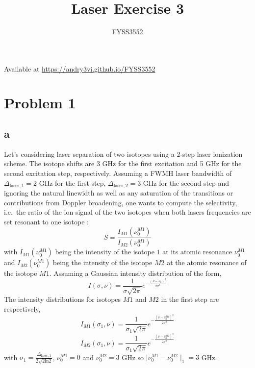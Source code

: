 \documentclass[
  a4paperpaper,
]{article}
\title{Laser Exercise 3}
\subtitle{FYSS3552}
\author{}
\date{}
\begin{document}
\maketitle
\ifdefined\Shaded\renewenvironment{Shaded}{\begin{tcolorbox}[boxrule=0pt, breakable, borderline west={3pt}{0pt}{shadecolor}, frame hidden, interior hidden, enhanced, sharp corners]}{\end{tcolorbox}}\fi

Available at \url{https://andry3vi.github.io/FYSS3552}

\hypertarget{problem-1}{%
\section{Problem 1}\label{problem-1}}

\hypertarget{a}{%
\subsection{a}\label{a}}

Let's considering laser separation of two isotopes using a 2-step laser
ionization scheme. The isotope shifts are 3 GHz for the first excitation
and 5 GHz for the second excitation step, respectively. Assuming a FWMH
laser bandwidth of \(\Delta_{\text{laser},1}=2\) GHz for the first step,
\(\Delta_{\text{laser},2}=3\) GHz for the second step and ignoring the
natural linewidth as well as any saturation of the transitions or
contributions from Doppler broadening, one wants to compute the
selectivity, i.e.~the ratio of the ion signal of the two isotopes when
both lasers frequencies are set resonant to one isotope : \[
    S=\frac{I_{M1}(\nu_0^{M1})}{I_{M2}(\nu_0^{M1})}
\] with \(I_{M1}(\nu_0^{M1})\) being the intensity of the isotope \(1\)
at its atomic resonance \(\nu_0^{M1}\) and \(I_{M2}(\nu_0^{M1})\) being
the intensity of the isotope \(M2\) at the atomic resonance of the
isotope \(M1\). Assuming a Gaussian intensity distribution of the form,
\[
    I(\sigma,\nu)=\frac{1}{\sigma\sqrt{2\pi}}e^{-\frac{(\nu-\nu_0)^2}{2\sigma^2}}
\] The intensity distributions for isotopes \(M1\) and \(M2\) in the
first step are respectively, \[ 
I_{M1}(\sigma_1,\nu)=\frac{1}{\sigma_1\sqrt{2\pi}}e^{-\frac{(\nu-\nu_0^{M1})^2}{2\sigma_1^2}}
\] \[
I_{M2}(\sigma_1,\nu)=\frac{1}{\sigma_1\sqrt{2\pi}}e^{-\frac{(\nu-\nu_0^{M2})^2}{2\sigma_1^2}}
\] with
\(\sigma_1=\frac{\Delta_{\text{laser},1}}{2\sqrt{2\text{ln}2}}\),
\(\nu_0^{M1}=0\) and \(\nu_0^{M2}=3\) GHz so
\(\mid \nu_0^{M1}-\nu_0^{M2} \mid_1=3\) GHz.
\end{document}
